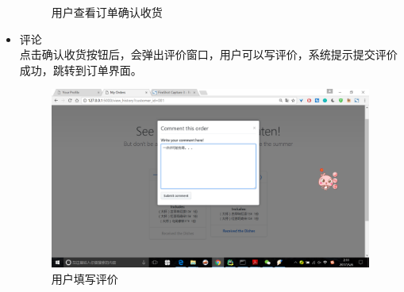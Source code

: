 \documentclass[12pt, oneside,a4paper]{article}
\begin{document}
\begin{itemize}
\begin{figure}[H]
     \caption{\small{用户查看订单确认收货}}
  \end{figure}
  \item 评论\\
  点击确认收货按钮后，会弹出评价窗口，用户可以写评价，系统提示提交评价成功，跳转到订单界面。
  \begin{figure}[H]
   \centering
     \includegraphics[width=6.00in]{cu-comment.jpg}
     \caption{\small{用户填写评价}}
  \end{figure}
  \end{itemize}
  
\end{document}
